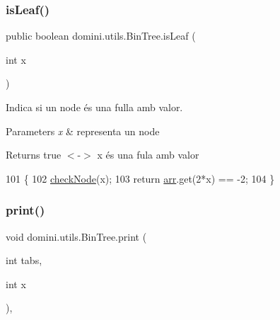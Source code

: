 \subsubsection{\texorpdfstring{is\+Leaf()}{isLeaf()}}
{\footnotesize\ttfamily public boolean domini.\+utils.\+Bin\+Tree.\+is\+Leaf (\begin{DoxyParamCaption}\item[{int}]{x }\end{DoxyParamCaption})\hspace{0.3cm}{\ttfamily [inline]}}



Indica si un node és una fulla amb valor. 


\begin{DoxyParams}{Parameters}
{\em x} & representa un node \\
\hline
\end{DoxyParams}
\begin{DoxyReturn}{Returns}
true $<$-\/$>$ x és una fula amb valor 
\end{DoxyReturn}

\begin{DoxyCode}
101                                  \{
102         \hyperlink{classdomini_1_1utils_1_1BinTree_a32b3e2ad7dfee3425e0b1f6f8b5100f5}{checkNode}(x);
103         \textcolor{keywordflow}{return} \hyperlink{classdomini_1_1utils_1_1BinTree_a357bcbcf07ba7fcb99d11b237d189e65}{arr}.get(2*x) == -2;
104     \}
\end{DoxyCode}
\mbox{\label{classdomini_1_1utils_1_1BinTree_a47c913594a3116b2e602c87fa4afc5c3}} 
\subsubsection{\texorpdfstring{print()}{print()}\hspace{0.1cm}{\footnotesize\ttfamily [1/2]}}
{\footnotesize\ttfamily void domini.\+utils.\+Bin\+Tree.\+print (\begin{DoxyParamCaption}\item[{int}]{tabs,  }\item[{int}]{x }\end{DoxyParamCaption})\hspace{0.3cm}{\ttfamily [inline]}, {\ttfamily [private]}}


